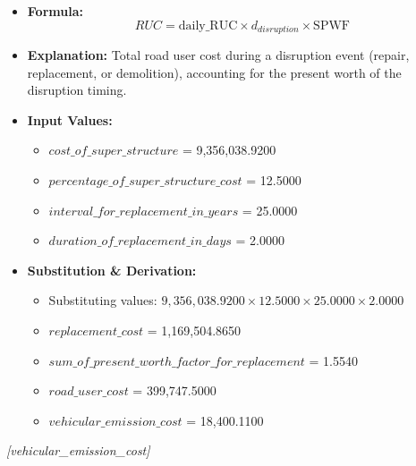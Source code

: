 \documentclass[12pt,a4paper]{article}
\begin{document}
\begin{itemize}
  \item \textbf{Formula:} $$RUC = \text{daily\_RUC} \times d_{disruption} \times \text{SPWF}$$
  \item \textbf{Explanation:} Total road user cost during a disruption event (repair, replacement, or demolition), accounting for the present worth of the disruption timing.
  \item \textbf{Input Values:}
  \begin{itemize}
    \item $cost\_of\_super\_structure$ = 9,356,038.9200
    \item $percentage\_of\_super\_structure\_cost$ = 12.5000
    \item $interval\_for\_replacement\_in\_years$ = 25.0000
    \item $duration\_of\_replacement\_in\_days$ = 2.0000
  \end{itemize}
  \item \textbf{Substitution \& Derivation:}
  \begin{itemize}
    \item Substituting values: $9,356,038.9200 \times 12.5000 \times 25.0000 \times 2.0000$
    \item $replacement\_cost$ = 1,169,504.8650
    \item $sum\_of\_present\_worth\_factor\_for\_replacement$ = 1.5540
    \item $road\_user\_cost$ = 399,747.5000
    \item $vehicular\_emission\_cost$ = 18,400.1100
  \end{itemize}
\end{itemize}


\textit{[vehicular\_emission\_cost]}
\end{document}
